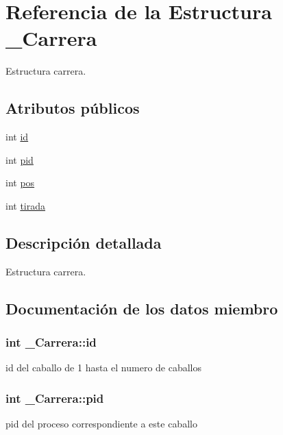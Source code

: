 \hypertarget{struct__Carrera}{}\section{Referencia de la Estructura \+\_\+\+Carrera}
\label{struct__Carrera}


Estructura carrera.  


\subsection*{Atributos públicos}
\begin{DoxyCompactItemize}
\item 
int \hyperlink{struct__Carrera_a842fb73a7e5fd05a5c80079b67eac95b}{id}
\item 
int \hyperlink{struct__Carrera_aae30a3f276a9ac25ffa42fa65736a735}{pid}
\item 
int \hyperlink{struct__Carrera_a2c723a949d2125c8989fabf48028ba12}{pos}
\item 
int \hyperlink{struct__Carrera_ae091854540d0a874642d92c971a0f86a}{tirada}
\end{DoxyCompactItemize}


\subsection{Descripción detallada}
Estructura carrera. 

\subsection{Documentación de los datos miembro}
\subsubsection[{\texorpdfstring{id}{id}}]{\setlength{\rightskip}{0pt plus 5cm}int \+\_\+\+Carrera\+::id}\hypertarget{struct__Carrera_a842fb73a7e5fd05a5c80079b67eac95b}{}\label{struct__Carrera_a842fb73a7e5fd05a5c80079b67eac95b}
id del caballo de 1 hasta el numero de caballos 
\subsubsection[{\texorpdfstring{pid}{pid}}]{\setlength{\rightskip}{0pt plus 5cm}int \+\_\+\+Carrera\+::pid}\hypertarget{struct__Carrera_aae30a3f276a9ac25ffa42fa65736a735}{}\label{struct__Carrera_aae30a3f276a9ac25ffa42fa65736a735}
pid del proceso correspondiente a este caballo 
